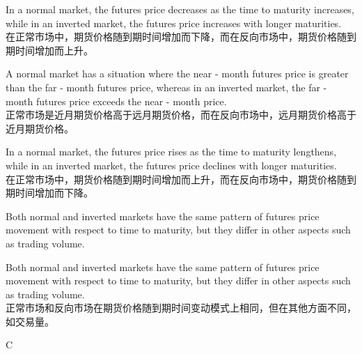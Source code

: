 \documentclass{article}
\begin{document}
    \begin{choices}
        \item In a normal market, the futures price decreases as the time to maturity increases, while in an inverted market, the futures price increases with longer maturities.\\
        在正常市场中，期货价格随到期时间增加而下降，而在反向市场中，期货价格随到期时间增加而上升。
        \item A normal market has a situation where the near - month futures price is greater than the far - month futures price, whereas in an inverted market, the far - month futures price exceeds the near - month price.\\
        正常市场是近月期货价格高于远月期货价格，而在反向市场中，远月期货价格高于近月期货价格。
        \item In a normal market, the futures price rises as the time to maturity lengthens, while in an inverted market, the futures price declines with longer maturities.\\
        在正常市场中，期货价格随到期时间增加而上升，而在反向市场中，期货价格随到期时间增加而下降。
        \item Both normal and inverted markets have the same pattern of futures price movement with respect to time to maturity, but they differ in other aspects such as trading volume.
        \item Both normal and inverted markets have the same pattern of futures price movement with respect to time to maturity, but they differ in other aspects such as trading volume.\\
        正常市场和反向市场在期货价格随到期时间变动模式上相同，但在其他方面不同，如交易量。
    \end{choices}
    
    \begin{correctanswer}
    C
    \end{correctanswer}
    
\end{document}
